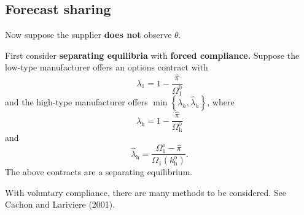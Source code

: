 \subsection{Forecast sharing}
Now suppose the supplier \textbf{does not} observe $\theta$. 

First consider \textbf{separating equilibria} with \textbf{forced compliance.}
Suppose the low-type manufacturer offers an options contract with
$$
\lambda_{1}=1-\frac{\hat{\pi}}{\Omega_{1}^{0}}
$$
and the high-type manufacturer offers $\min \left\{\lambda_{h}, \hat{\lambda}_{h}\right\}$, where
$$
\lambda_{\mathrm{h}}=1-\frac{\hat{\pi}}{\Omega_{\mathrm{h}}^{\mathrm{o}}}
$$
and
$$
\hat{\lambda}_{\mathrm{h}}=\frac{\Omega_{1}^{\mathrm{o}}-\hat{\pi}}{\Omega_{1}\left(k_{\mathrm{h}}^{\mathrm{o}}\right)} .
$$
The above contracts are a separating equilibrium.

With voluntary compliance, there are many methods to be considered. See Cachon and Lariviere (2001).